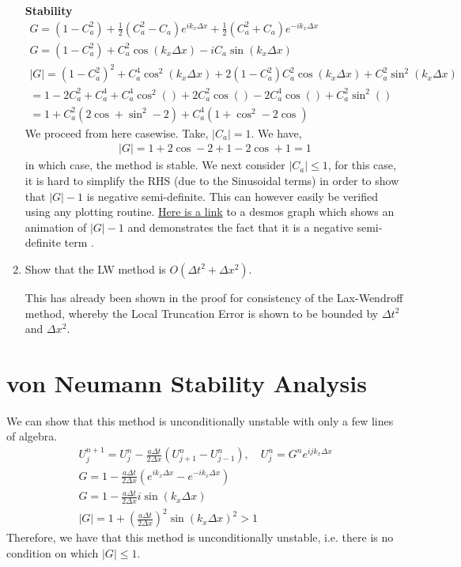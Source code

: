 \documentclass{article}
\begin{document}
\begin{enumerate}[label = (\alph*)]
        \textbf{Stability} 
        \begin{gather*}
            G = (1 - C_a^2) + \frac{1}{2}\left(C_a^2 - C_a\right) e^{ik_x\Delta
            x} + \frac{1}{2}\left(C_a^2 + C_a\right) e^{-ik_x\Delta x}\\
            G = (1 - C_a^2) + C_a^2\cos(k_x \Delta x) - iC_a\sin(k_x \Delta x)\\
            |G| = (1 - C_a^2)^2 + C_a^4\cos^2(k_x \Delta x) + 2(1 -
            C_a^2)C_a^2\cos(k_x\Delta x) + C_a^2\sin^2(k_x\Delta x)\\
            = 1 - 2C_a^2 + C_a^4 + C_a^4\cos^2() + 2C_a^2\cos() - 2C_a^4\cos() +
            C_a^2\sin^2()\\
            = 1 + C_a^2\left(2\cos + \sin^2 - 2\right) + C_a^4\left(1 + \cos^2 -
            2\cos\right)
        \end{gather*}
        We proceed from here casewise. Take, $|C_a| = 1$. We have, 
        \begin{gather*}
            |G| = 1 + 2\cos - 2 + 1 - 2\cos + 1 = 1
        \end{gather*}
        in which case, the method is stable. 
        We next consider $|C_a| \le 1$, for this case, it is hard to simplify
        the RHS (due to the Sinusoidal terms)
        in order to show that $|G| - 1$ is negative semi-definite. This
        can however easily be verified using any plotting routine. 
        \href{https://www.desmos.com/calculator/znn8cfqqxg}{Here is a
        link} to a desmos graph which shows an animation of $|G| - 1$ and
        demonstrates the fact that it is a negative semi-definite term . 

    

    \item Show that the LW method is $O(\Delta t^2 + \Delta x^2)$.

    This has already been shown in the proof for consistency of the Lax-Wendroff
    method, whereby the Local Truncation Error is shown to be bounded by $\Delta
    t^2$ and $\Delta x^2$. 
\end{enumerate}

\section{von Neumann Stability Analysis}
We can show that this method is unconditionally unstable with only a few lines
of algebra. 
\begin{gather*}
    U_j^{n+1} = U_j^n - \frac{a\Delta t}{2\Delta x}\left(U_{j+1}^n -
    U_{j-1}^n\right), \quad U_{j}^n = G^ne^{i j k_x \Delta x}\\
    G = 1 - \frac{a\Delta t}{2\Delta x}\left(e^{ik_x\Delta x}  - e^{-ik_x\Delta
    x}\right)\\
    G = 1 - \frac{a\Delta t}{2\Delta x}i\sin(k_x\Delta x)\\
    |G| = 1 + \left(\frac{a\Delta t}{2\Delta x}\right)^2\sin(k_x\Delta x)^2 > 1
\end{gather*}
Therefore, we have that this method is unconditionally unstable, i.e. there is
no condition on which $|G| \le 1$. 
\end{document}
